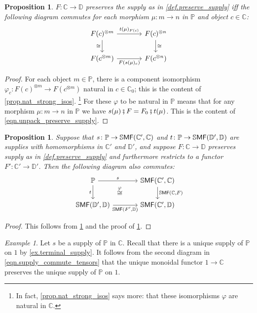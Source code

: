 \documentclass[11pt, oneside, article]{memoir}
\theoremstyle{plain}
\newtheorem{proposition}[theorem]{Proposition}
\theoremstyle{definition}
\theoremstyle{remark}
\newtheorem{example}[theorem]{Example}
\newcommand{\ccat}[1]{\mathbb{#1}}%
\newcommand{\Cat}[1]{{\mathsf{#1}}}%
\newcommand{\CCat}[1]{\mathbb{\StrLeft{#1}{1}}\Cat{\StrGobbleLeft{#1}{1}}}%
\newcommand{\tpow}[1]{^{\otimes #1}}
\newcommand{\ssmf}{\CCat{SMF}}
\newcommand{\cc}{\mathbb{C}}
\newcommand{\dd}{\mathbb{D}}
\newcommand{\pp}{\mathbb{P}}
\newcommand{\cp}{\mathbin{\fatsemi}}
\begin{document}
\begin{proposition}\label{prop.easy_pres_supply}
$F\colon\ccat{C}\to\dd$ preserves the supply as in \cref{def.preserve_supply} iff the following diagram commutes for each morphism $\mu\colon m\to n$ in $\pp$ and object $c\in\ccat{C}$:
\begin{equation}\label{eqn.unpack_preserve_supply}
\begin{tikzcd}[column sep=large]
	F(c)\tpow{m}\ar[r, "t(\mu)_{F(c)}"]\ar[d, "\cong"']&
	F(c)\tpow{n}\ar[d, "\cong"]\\
	F(c\tpow{m})\ar[r, "F(s(\mu)_c)"']&
	F(c\tpow{n})
\end{tikzcd}
\end{equation}
\end{proposition}
\begin{proof}
For each object $m\in\pp$, there is a component isomorphism $\varphi_c\colon F(c)\tpow{m}\to F(c\tpow{m})$ natural in $c\in\cc_0$; this is the content of \cref{prop.nat_strong_isos}.%
\footnote{In fact, \cref{prop.nat_strong_isos} says more: that these isomorphisms $\varphi$ are natural in $\cc$.\label{foot.natural}}
  For these $\varphi$ to be natural in $\pp$ means that for any morphism $\mu\colon m\to n$ in $\pp$ we have $s(\mu)\cp F=F_0\cp t(\mu)$. This is the content of \cref{eqn.unpack_preserve_supply}.
\end{proof}

\begin{proposition}
Suppose that $s\colon\pp\to\ssmf(\cc',\cc)$ and $t\colon\pp\to\ssmf(\dd',\dd)$ are supplies with homomorphisms in $\cc'$ and $\dd'$, and suppose $F\colon\cc\to\dd$ preserves supply as in \cref{def.preserve_supply} and furthermore restricts to a functor $F'\colon\cc'\to\dd'$. Then the following diagram also commutes:
\[
\begin{tikzcd}[column sep=large]
	\pp\ar[r, "s"]\ar[d, "t"']&
	\ssmf(\cc',\cc)\ar[d, "{\ssmf(\cc,F)}"]\\
	\ssmf(\dd',\dd)\ar[r, "{\ssmf(F',\dd)}"']&
	\ssmf(\cc',\dd)\ar[ul, phantom, "\overset{\varphi}{\cong}"]
\end{tikzcd}
\]
\end{proposition}
\begin{proof}
This follows from \cref{foot.natural} and the proof of \cref{prop.easy_pres_supply}.
\end{proof}

\begin{example}
Let $s$ be a supply of $\pp$ in $\cc$. Recall that there is a unique supply of $\pp$ on $1$ by \cref{ex.terminal_supply}. It follows from the second diagram in \cref{eqn.supply_commute_tensors} that the unique monoidal functor $1\to\cc$ preserves the unique supply of $\pp$ on $1$.
\end{example}
\end{document}
